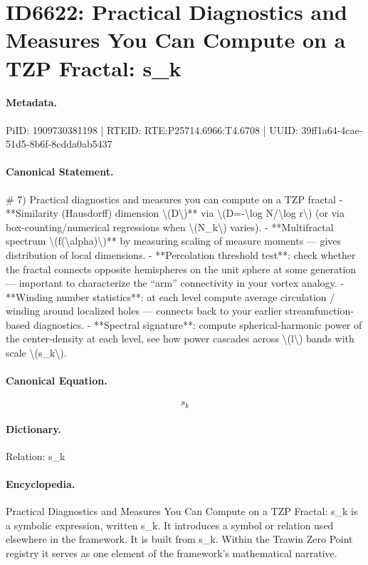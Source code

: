 \section*{ID6622: Practical Diagnostics and Measures You Can Compute on a TZP Fractal: s\_k}
\paragraph{Metadata.}
PiID: 1909730381198 | RTEID: RTE:P25714.6966:T4.6708 | UUID: 39ff1a64-4cae-51d5-8b6f-8cdda0ab5437

\paragraph{Canonical Statement.}
\# 7) Practical diagnostics and measures you can compute on a TZP fractal - **Similarity (Hausdorff) dimension \textbackslash{}(D\textbackslash{})** via \textbackslash{}(D=-\textbackslash{}log N/\textbackslash{}log r\textbackslash{}) (or via box-counting/numerical regressions when \textbackslash{}(N\_k\textbackslash{}) varies). - **Multifractal spectrum \textbackslash{}(f(\textbackslash{}alpha)\textbackslash{})** by measuring scaling of measure moments — gives distribution of local dimensions. - **Percolation threshold test**: check whether the fractal connects opposite hemispheres on the unit sphere at some generation — important to characterize the “arm” connectivity in your vortex analogy. - **Winding number statistics**: at each level compute average circulation / winding around localized holes — connects back to your earlier streamfunction-based diagnostics. - **Spectral signature**: compute spherical-harmonic power of the center-density at each level, see how power cascades across \textbackslash{}(l\textbackslash{}) bands with scale \textbackslash{}(s\_k\textbackslash{}).

\paragraph{Canonical Equation.}
\[
s_k
\]

\paragraph{Dictionary.}
Relation: s\_k

\paragraph{Encyclopedia.}
Practical Diagnostics and Measures You Can Compute on a TZP Fractal: s\_k is a symbolic expression, written s\_k. It introduces a symbol or relation used elsewhere in the framework. It is built from s\_k. Within the Trawin Zero Point registry it serves as one element of the framework's mathematical narrative.
